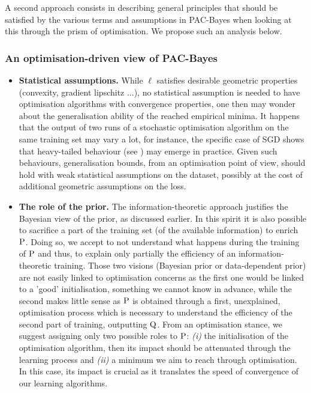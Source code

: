 A second approach consists in describing general principles that should be satisfied by the various terms and assumptions in PAC-Bayes when looking at this through the prism of optimisation. We propose such an analysis below.

\subsubsection*{An optimisation-driven view of PAC-Bayes}

\begin{itemize}
  \item \textbf{Statistical assumptions.} While $\ell$ satisfies desirable geometric properties (convexity, gradient lipschitz ...), no statistical assumption is needed to have optimisation algorithms with convergence properties, one then may wonder about the generalisation ability of the reached empirical minima. It happens that the output of two runs of a stochastic optimisation algorithm on the same training set may vary a lot, for instance, the specific case of SGD shows that  heavy-tailed behaviour (see \eg \citealp{simsekli2019tail,zhang2020adaptive,gurbuzbalaban2020heavy}) may emerge in practice. Given such behaviours, generalisation bounds, from an optimisation point of view, should hold with weak statistical assumptions on the dataset, possibly at the cost of additional geometric assumptions on the loss.
  \item \textbf{The role of the prior.} The information-theoretic approach justifies the Bayesian view of the prior, as discussed earlier. In this spirit it is also possible to sacrifice a part of the training set (\ie of the available information) to enrich $\P$. Doing so, we accept to not understand what happens during the training of $\P$ and thus, to explain only partially the efficiency of an information-theoretic training. Those two visions (Bayesian prior or data-dependent prior) are not easily linked to optimisation concerns as the first one would be linked to a 'good' initialisation, something we cannot know in advance, while the second makes little sense as $\P$ is obtained through a first, unexplained, optimisation process which is necessary to understand the efficiency of the second part of training, outputting $\Q$. From an optimisation stance, we suggest assigning only two possible roles to $\P$: \textit{(i)} the initialisation of the optimisation algorithm, then its impact should be attenuated through the learning process and \textit{(ii)} a minimum we aim to reach through optimisation. In this case, its impact is crucial as it translates the speed of convergence of our learning algorithms.

\end{itemize}
